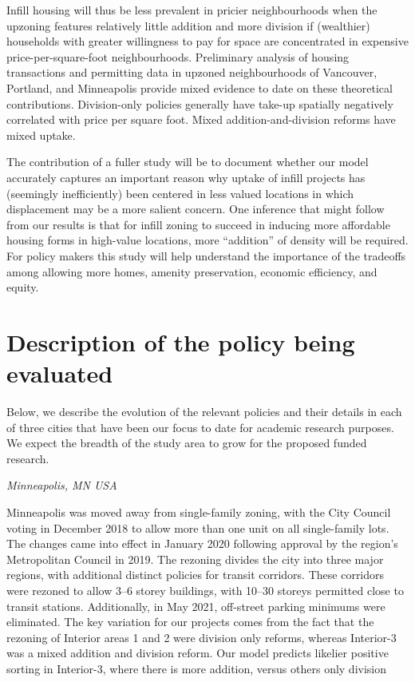 \documentclass[12pt]{article}
\begin{document}
Infill housing will thus be less prevalent in pricier neighbourhoods when the
upzoning features relatively little addition and more division if (wealthier)
households with greater willingness to pay for space  are concentrated in
expensive price-per-square-foot neighbourhoods. Preliminary analysis of housing
transactions and permitting data in upzoned neighbourhoods of Vancouver,
Portland, and Minneapolis provide mixed evidence to date on these theoretical
contributions. Division-only policies generally have take-up spatially
negatively correlated with price per square foot. Mixed addition-and-division
reforms have mixed uptake. 

The contribution of a fuller study will be to document whether our model
accurately captures an important reason why uptake of infill projects has
(seemingly inefficiently) been centered in less valued locations in which
displacement may be a more salient concern. One inference that might follow
from our results is that for infill zoning to succeed in inducing more
affordable housing forms in high-value locations, more ``addition'' of density
will be required. For policy makers this study will help understand the importance of the tradeoffs among allowing more homes, amenity preservation, economic efficiency, and equity.  


\section{Description of the policy being evaluated}

Below, we describe the evolution of the relevant policies and their details in
each of three cities that have been our focus to date for academic research
purposes. We expect the breadth of the study area to grow for the proposed
funded research.

\textit{Minneapolis, MN USA}

Minneapolis was moved away from single-family zoning, with the City Council
voting in December 2018 to allow more than one unit on all single-family lots.
The changes came into effect in January 2020 following approval by the region’s
Metropolitan Council in 2019. The rezoning divides the city into three major
regions, with additional distinct policies for transit corridors. These
corridors were rezoned to allow 3–6 storey buildings, with 10–30 storeys
permitted close to transit stations. Additionally, in May 2021, off-street
parking minimums were eliminated. The key variation for our projects comes from
the fact that the rezoning of Interior areas 1 and 2 were division only
reforms, whereas Interior-3 was a mixed addition and division reform. Our model
predicts likelier positive sorting in Interior-3, where there is more addition,
versus others only division
\end{document}

